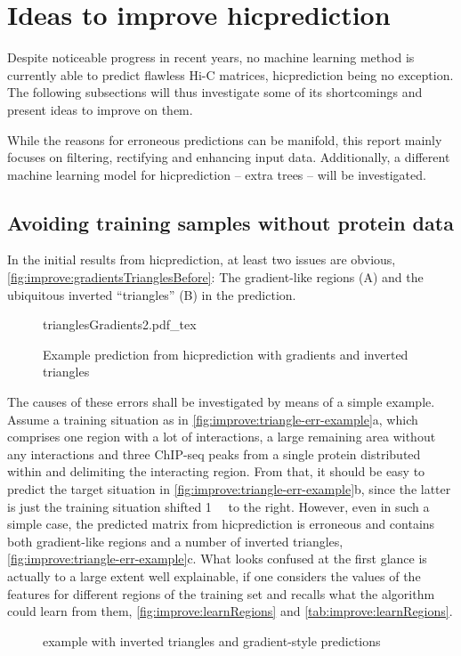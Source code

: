 \section{Ideas to improve hicprediction} \label{sec:improve:main}
Despite noticeable progress in recent years, no machine learning method is currently able
to predict flawless Hi-C matrices, hicprediction being no exception.
The following subsections will thus
investigate some of its shortcomings and present ideas
to improve on them. 

While the reasons for erroneous predictions can be manifold,
this report mainly focuses on filtering, rectifying and enhancing input data.
Additionally, a different machine learning model for hicprediction -- extra trees -- will be investigated.

\subsection{Avoiding training samples without protein data} \label{sec:improve:emptySamples}
In the initial results from hicprediction, at least two issues are obvious, \autoref{fig:improve:gradientsTrianglesBefore}:
The gradient-like regions (A) and the ubiquitous inverted ``triangles'' (B) in the prediction.
\begin{figure}[h]
 \scriptsize
 {trianglesGradients2.pdf_tex}
 \caption{Example prediction from hicprediction with gradients and inverted triangles}
 \label{fig:improve:gradientsTrianglesBefore}
\end{figure}

The causes of these errors shall be investigated by means of a simple example.
Assume a training situation as in \autoref{fig:improve:triangle-err-example}a, which comprises
one region with a lot of interactions, a large remaining area without any interactions 
and three ChIP-seq peaks from a single protein distributed within and delimiting the interacting region.
From that, it should be easy to predict the target situation in \autoref{fig:improve:triangle-err-example}b, 
since the latter is just the training situation shifted \SI{1}{\mega\bp} to the right.
However, even in such a simple case, the predicted matrix from hicprediction is erroneous
and contains both gradient-like regions and a number of inverted triangles, \autoref{fig:improve:triangle-err-example}c. 
What looks confused at the first glance is actually to a large extent well explainable, 
if one considers the values of the features for different regions of the training set 
and recalls what the algorithm could learn from them, 
\autoref{fig:improve:learnRegions} and \autoref{tab:improve:learnRegions}.
\begin{figure}[ht]
 \centering
 \caption{example with inverted triangles and gradient-style predictions}
 \label{fig:improve:triangle-err-example}
\end{figure}

